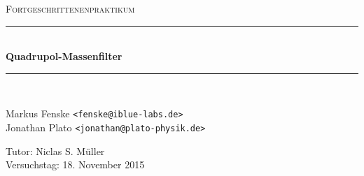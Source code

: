 \newcommand{\HRule}{\rule{\linewidth}{0.5mm}}

\begin{center}
  \textsc{\Large Fortgeschrittenenpraktikum}
  \HRule\\[0.4 cm]
  {\huge \bfseries Quadrupol-Massenfilter}
  \HRule\\[0.4 cm]

  \begin{minipage}{0.60\textwidth}
  \begin{flushleft}
    Markus Fenske \texttt{<fenske@iblue-labs.de>} \\
    Jonathan Plato \texttt{<jonathan@plato-physik.de>}
  \end{flushleft}
  \end{minipage}
  \hfill
  \begin{minipage}{0.35\textwidth}
  \begin{flushright}
    Tutor: Niclas S. Müller \\
    Versuchstag: 18. November 2015
  \end{flushright}
  \end{minipage}

  \vspace{1cm}

  \tableofcontents


  \vfill
\end{center}
\newpage
